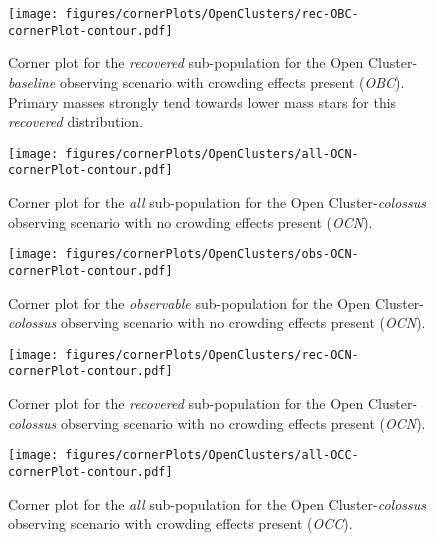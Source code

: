 \documentclass[twocolumn]{aastex63}
\begin{document}
\begin{figure}
    \centering
    \texttt{[image: figures/cornerPlots/OpenClusters/rec-OBC-cornerPlot-contour.pdf]}
    \caption{Corner plot for the \textit{recovered} sub-population for the Open Cluster-\textit{baseline} observing scenario with crowding effects present (\textit{OBC}). Primary masses strongly tend towards lower mass stars for this \textit{recovered} distribution.}
    \label{fig:obc-rec-corner-plot-appendix}
\end{figure}\clearpage

\begin{figure}
    \centering
    \texttt{[image: figures/cornerPlots/OpenClusters/all-OCN-cornerPlot-contour.pdf]}
    \caption{Corner plot for the \textit{all} sub-population for the Open Cluster-\textit{colossus} observing scenario with no crowding effects present (\textit{OCN}).}
    \label{fig:ocn-All-corner-plot-appendix}
\end{figure}\clearpage

\begin{figure}
    \centering
    \texttt{[image: figures/cornerPlots/OpenClusters/obs-OCN-cornerPlot-contour.pdf]}
    \caption{Corner plot for the \textit{observable} sub-population for the Open Cluster-\textit{colossus} observing scenario with no crowding effects present (\textit{OCN}).}
    \label{fig:ocn-Obs-corner-plot-appendix}
\end{figure}\clearpage

\begin{figure}
    \centering
    \texttt{[image: figures/cornerPlots/OpenClusters/rec-OCN-cornerPlot-contour.pdf]}
    \caption{Corner plot for the \textit{recovered} sub-population for the Open Cluster-\textit{colossus} observing scenario with no crowding effects present (\textit{OCN}).}
    \label{fig:ocn-Rec-corner-plot-appendix}
\end{figure}\clearpage

\begin{figure}
    \centering
    \texttt{[image: figures/cornerPlots/OpenClusters/all-OCC-cornerPlot-contour.pdf]}
    \caption{Corner plot for the \textit{all} sub-population for the Open Cluster-\textit{colossus} observing scenario with crowding  effects present (\textit{OCC}).}
    \label{fig:occ-All-corner-plot-appendix}
\end{figure}\clearpage
\end{document}
